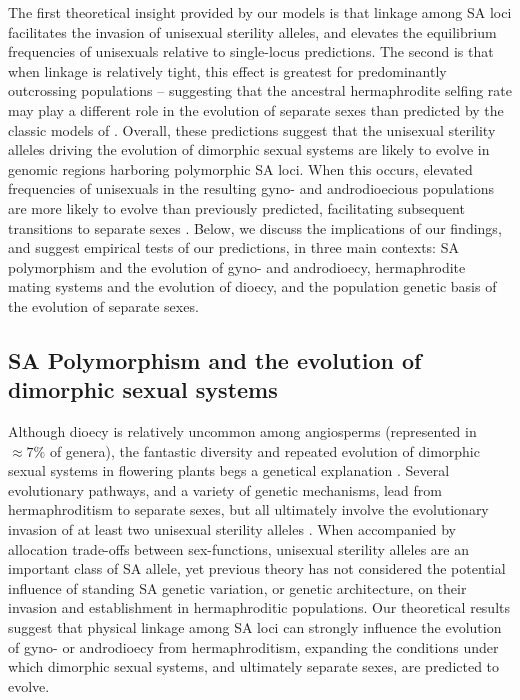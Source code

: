 \documentclass[9pt,twocolumn,twoside,lineno]{gsajnl}
\begin{document}
The first theoretical insight provided by our models is that linkage among SA loci facilitates the invasion of unisexual sterility alleles, and elevates the equilibrium frequencies of unisexuals relative to single-locus predictions. The second is that when linkage is relatively tight, this effect is greatest for predominantly outcrossing populations -- suggesting that the ancestral hermaphrodite selfing rate may play a different role in the evolution of separate sexes than predicted by the classic models of \citep{Charlesworth1978a}. Overall, these predictions suggest that the unisexual sterility alleles driving the evolution of dimorphic sexual systems are likely to evolve in genomic regions harboring polymorphic SA loci. When this occurs, elevated frequencies of unisexuals in the resulting gyno- and androdioecious populations are more likely to evolve than previously predicted, facilitating subsequent transitions to separate sexes \citep{Charlesworth1978a}. Below, we discuss the implications of our findings, and suggest empirical tests of our predictions, in three main contexts: SA polymorphism and the evolution of gyno- and androdioecy, hermaphrodite mating systems and the evolution of dioecy, and the population genetic basis of the evolution of separate sexes.

\subsection{SA Polymorphism and the evolution of dimorphic sexual systems}

Although dioecy is relatively uncommon among angiosperms (represented in $\approx 7\%$ of genera), the fantastic diversity and repeated evolution of dimorphic sexual systems in flowering plants begs a genetical explanation \citep{Renner2014,KaferPannell2017}. Several evolutionary pathways, and a variety of genetic mechanisms, lead from hermaphroditism to separate sexes, but all ultimately involve the evolutionary invasion of at least two unisexual sterility alleles \citep{Charlesworth1978a,Charlesworth1978b,Renner2014,Ashman2015}. When accompanied by allocation trade-offs between sex-functions, unisexual sterility alleles are an important class of SA allele, yet previous theory has not considered the potential influence of standing SA genetic variation, or genetic architecture, on their invasion and establishment in hermaphroditic populations. Our theoretical results suggest that physical linkage among SA loci can strongly influence the evolution of gyno- or androdioecy from hermaphroditism, expanding the conditions under which dimorphic sexual systems, and ultimately separate sexes, are predicted to evolve. 
\end{document}
